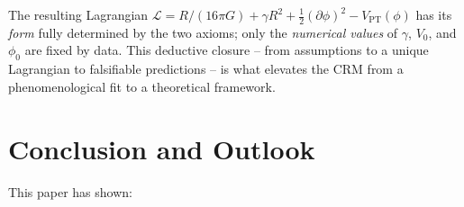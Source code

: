 \documentclass[aps,prd,twocolumn,superscriptaddress,nofootinbib]{revtex4-2}
\begin{document}
The resulting Lagrangian $\mathcal{L} = R/(16\pi G) + \gamma R^2 + \frac{1}{2}(\partial\phi)^2 - V_{\mathrm{PT}}(\phi)$ has its \textit{form} fully determined by the two axioms; only the \textit{numerical values} of $\gamma$, $V_0$, and $\phi_0$ are fixed by data. This deductive closure -- from assumptions to a unique Lagrangian to falsifiable predictions -- is what elevates the CRM from a phenomenological fit to a theoretical framework.


\section{Conclusion and Outlook}
\label{sec:conclusion}

This paper has shown:
\end{document}
